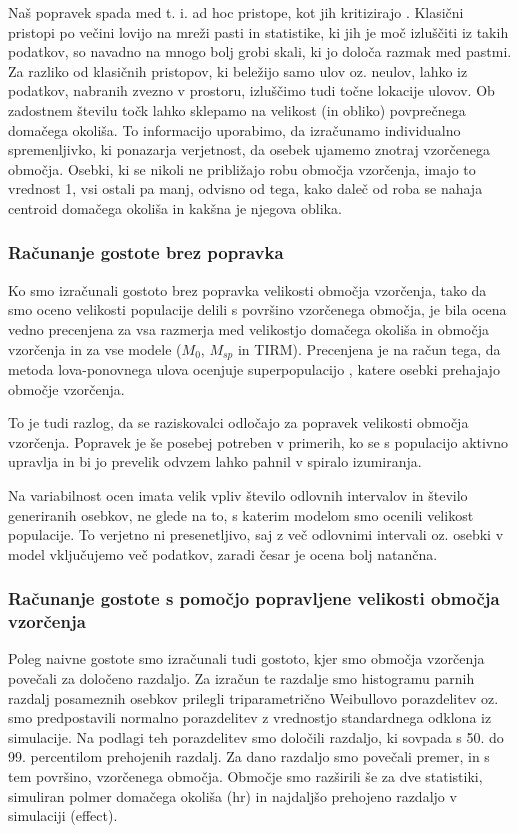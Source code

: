 Naš popravek spada med t. i. ad hoc pristope, kot jih kritizirajo \citet{royle_spatial_2013}. Klasični pristopi po večini lovijo na mreži pasti in statistike, ki jih je moč izluščiti iz takih podatkov, so navadno na mnogo bolj grobi skali, ki jo določa razmak med pastmi. Za razliko od klasičnih pristopov, ki beležijo samo ulov oz. neulov, lahko iz podatkov, nabranih zvezno v prostoru, izluščimo tudi točne lokacije ulovov. Ob zadostnem številu točk lahko sklepamo na velikost (in obliko) povprečnega domačega okoliša. To informacijo uporabimo, da izračunamo individualno spremenljivko, ki ponazarja verjetnost, da osebek ujamemo znotraj vzorčenega območja. Osebki, ki se nikoli ne približajo robu območja vzorčenja, imajo to vrednost 1, vsi ostali pa manj, odvisno od tega, kako daleč od roba se nahaja centroid domačega okoliša in kakšna je njegova oblika.

\subsubsection[\bfseries Računanje gostote brez popravka]{Računanje gostote brez popravka}
Ko smo izračunali gostoto brez popravka velikosti območja vzorčenja, tako da smo oceno velikosti populacije delili s površino vzorčenega območja, je bila ocena vedno precenjena za vsa razmerja med velikostjo domačega okoliša in območja vzorčenja in za vse modele ($M_0$, $M_{sp}$ in TIRM). Precenjena je na račun tega, da metoda lova-ponovnega ulova ocenjuje superpopulacijo \citep{white_capture-recapture_1982}, katere osebki prehajajo območje vzorčenja.

To je tudi razlog, da se raziskovalci odločajo za popravek velikosti območja vzorčenja. Popravek je še posebej potreben v primerih, ko se s populacijo aktivno upravlja in bi jo prevelik odvzem lahko pahnil v spiralo izumiranja.

Na variabilnost ocen imata velik vpliv število odlovnih intervalov in število generiranih osebkov, ne glede na to, s katerim modelom smo ocenili velikost populacije. To verjetno ni presenetljivo, saj z več odlovnimi intervali oz. osebki v model vključujemo več podatkov, zaradi česar je ocena bolj natančna.

\subsubsection[\bfseries Računanje gostote s pomočjo popravljene velikosti območja vzorčenja]{Računanje gostote s pomočjo popravljene velikosti območja vzorčenja}
Poleg naivne gostote smo izračunali tudi gostoto, kjer smo območja vzorčenja povečali za določeno razdaljo. Za izračun te razdalje smo histogramu parnih razdalj posameznih osebkov prilegli triparametrično Weibullovo porazdelitev oz. smo predpostavili normalno porazdelitev z vrednostjo standardnega odklona iz simulacije. Na podlagi teh porazdelitev smo določili razdaljo, ki sovpada s 50. do 99. percentilom prehojenih razdalj. Za dano razdaljo smo povečali premer, in s tem površino, vzorčenega območja. Območje smo razširili še za dve statistiki, simuliran polmer domačega okoliša (hr) in najdaljšo prehojeno razdaljo v simulaciji (effect).

